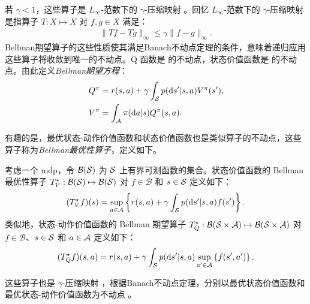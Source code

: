 若 $\gamma<1$，这些算子是 $L_\infty$-范数下的 $\gamma$-压缩映射 \cite[Proposition~6.2.5]{puterman1994markov}。回忆 $L_\infty$-范数下的 $\gamma$-压缩映射是指算子 $T:X\mapsto X$ 对 $f,g\in X$ 满足：
\begin{align*}
    \lVert Tf - Tg\rVert_\infty\le\gamma\lVert f-g\rVert_\infty.
\end{align*}
Bellman期望算子的这些性质使其满足Banach不动点定理的条件，意味着递归应用这些算子将收敛到唯一的不动点。Q 函数是  的不动点，状态价值函数是  的不动点。由此定义\emph{Bellman期望方程}：
\begin{align}
    Q^\pi &= r(s,a) + \gamma  \int_{\mathcal{S}}  p(\mathrm{d} s'\vert s,a)V^\pi(s'),
    \label{eq:bellman_equation_Q}\\
    V^\pi &= \int_{\mathcal{A}} \pi(\mathrm{d} a\vert s) Q^\pi(s,a).
    \label{eq:bellman_equation_V}
\end{align}

有趣的是，最优状态-动作价值函数和状态价值函数也是类似算子的不动点，这些算子称为\emph{Bellman最优性算子}，定义如下。

\begin{defi}[Bellman最优性算子]
    考虑一个 \gls{mdp}，令 $\mathcal{B}(\mathcal{S})$ 为 $\mathcal{S}$ 上有界可测函数的集合。状态价值函数的 Bellman 最优性算子 $T^{\star}_V:\mathcal{B}(\mathcal{S})\mapsto\mathcal{B}(\mathcal{S})$ 对 $f\in\mathcal{B}$ 和 $s\in\mathcal{S}$ 定义如下：
    \begin{align}
    \label{eq:bellman_optimal_operator_V}
        (T^{\star}_V f)(s) = \sup_{a\in\mathcal{A}}\left\{r(s,a) + \gamma  \int_{\mathcal{S}}  p(\mathrm{d} s'\vert s,a) f(s')\right\}.
    \end{align}
    类似地，状态-动作价值函数的 Bellman 期望算子 $T^{\star}_Q:\mathcal{B}(\mathcal{S}\times\mathcal{A})\mapsto\mathcal{B}(\mathcal{S}\times\mathcal{A})$ 对 $f\in\mathcal{B}$、$s\in\mathcal{S}$ 和 $a\in\mathcal{A}$ 定义如下：
    \begin{align}
    \label{eq:bellman_optimal_operator_Q}
        (T^{\star}_Q f)(s,a) = r(s,a) + \gamma  \int_{\mathcal{S}}  p(\mathrm{d} s'\vert s,a)\sup_{a'\in\mathcal{A}} \left\{f(s',a')\right\}.
    \end{align}
\end{defi}

这些算子也是 $\gamma$-压缩映射 \cite[Proposition~6.2.4]{puterman1994markov}，根据Banach不动点定理，分别以最优状态价值函数和最优状态-动作价值函数为不动点 \cite[Proposition~6.2.5]{puterman1994markov}。

